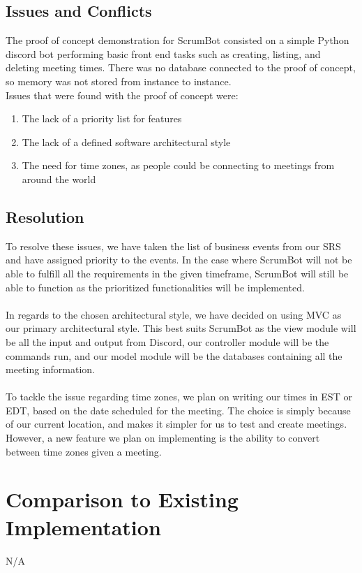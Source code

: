 \documentclass[12pt, titlepage]{article}
\begin{document}
\subsection{Issues and Conflicts}
The proof of concept demonstration for ScrumBot consisted on a simple Python discord bot performing basic front end tasks such as creating, listing, and deleting meeting times. There was no database connected to the proof of concept, so memory was not stored from instance to instance.\\
\noindent Issues that were found with the proof of concept were:
\begin{enumerate}
    \item The lack of a priority list for features
    \item The lack of a defined software architectural style
    \item The need for time zones, as people could be connecting to meetings from around the world
\end{enumerate}

\subsection{Resolution}
To resolve these issues, we have taken the list of business events from our SRS and have assigned priority to the events. In the case where ScrumBot will not be able to fulfill all the requirements in the given timeframe, ScrumBot will still be able to function as the prioritized functionalities will be implemented.\\ \\
\noindent In regards to the chosen architectural style, we have decided on using MVC as our primary architectural style. This best suits ScrumBot as the view module will be all the input and output from Discord, our controller module will be the commands run, and our model module will be the databases containing all the meeting information.\\ \\
\noindent To tackle the issue regarding time zones, we plan on writing our times in EST or EDT, based on the date scheduled for the meeting. The choice is simply because of our current location, and makes it simpler for us to test and create meetings. However, a new feature we plan on implementing is the ability to convert between time zones given a meeting.
	
\section{Comparison to Existing Implementation}
N/A
\end{document}
